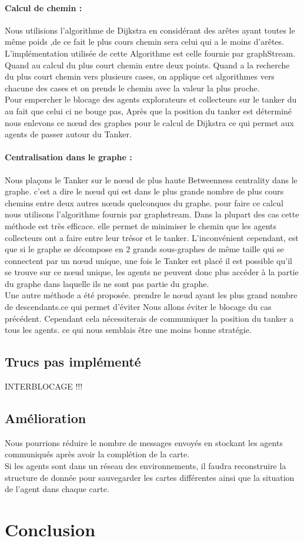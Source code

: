 \documentclass[10pt]{article}
\newcommand\tab[1][0.65cm]{\hspace*{#1}}
\begin{document}
\paragraph{Calcul de chemin :} Nous utilisions l'algorithme de Dijkstra en considérant des arêtes ayant toutes le même poids ,de ce fait le plus cours chemin sera celui qui a le moins d'arêtes. L'implémentation utilisée de cette Algorithme est celle fournie par graphStream. Quand au calcul du plus court chemin entre deux  points. Quand a la recherche du plus court chemin vers plusieurs cases, on applique cet algorithmes vers chacune des cases et on prends le chemin avec la valeur la plus proche.\\
\tab Pour empercher le blocage des agents explorateurs et collecteurs sur le tanker du au fait que celui ci ne bouge pas, Après que la position du tanker est déterminé nous enlevons ce nœud des graphes pour le calcul de Dijkstra ce qui permet aux agents de passer autour du Tanker.
\paragraph{Centralisation dans le graphe :} Nous plaçons le Tanker sur le nœud de plus haute Betweenness centrality dans le graphe. c'est a dire le nœud  qui est dans le plus grande nombre de plus cours chemins entre deux autres nœuds quelconques du graphe. pour faire ce calcul nous utilisons l'algorithme fournis par graphstream. Dans la plupart des cas cette méthode est très efficace. elle permet de minimiser le chemin que les agents collecteurs ont a faire entre leur trésor et le tanker. L'inconvénient cependant, est que si le graphe se décompose en 2 grands sous-graphes de même taille qui se connectent par un nœud unique, une fois le Tanker est placé il est possible qu'il se trouve sur ce nœud unique, les agents ne peuvent donc plus accéder à la partie du graphe dans laquelle ils ne sont pas partie du graphe.\\
\tab Une autre méthode a été proposée. prendre le nœud ayant les plus grand nombre de descendants.ce qui permet d'éviter Nous allons éviter le blocage du cas précédent. Cependant cela nécessiterais de communiquer la position du tanker a tous les agents. ce qui nous semblais être une moins bonne stratégie.
	
\subsection{Trucs pas implémenté}
{\Huge INTERBLOCAGE !!!}
\subsection{Amélioration}
Nous pourrions réduire le nombre de messages envoyés en stockant les agents communiqués après avoir la complétion de la carte.\\
\tab Si les agents sont dans un réseau des environnements, il faudra reconstruire la structure de donnée pour sauvegarder les cartes différentes ainsi que la situation de l'agent dans chaque carte.
\section{Conclusion}



	
\end{document}
